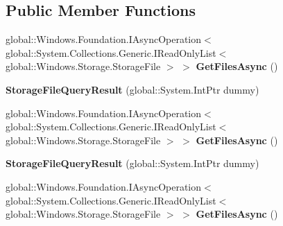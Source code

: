 \subsection*{Public Member Functions}
\begin{DoxyCompactItemize}
\item 
\mbox{\label{class_windows_1_1_storage_1_1_search_1_1_storage_file_query_result_a3c9c23aca5517c18087b5b0200d6de04}} 
global\+::\+Windows.\+Foundation.\+I\+Async\+Operation$<$ global\+::\+System.\+Collections.\+Generic.\+I\+Read\+Only\+List$<$ global\+::\+Windows.\+Storage.\+Storage\+File $>$ $>$ {\bfseries Get\+Files\+Async} ()
\item 
\mbox{\label{class_windows_1_1_storage_1_1_search_1_1_storage_file_query_result_accd8b919bc86f37f4a3609c2d88ab36e}} 
{\bfseries Storage\+File\+Query\+Result} (global\+::\+System.\+Int\+Ptr dummy)
\item 
\mbox{\label{class_windows_1_1_storage_1_1_search_1_1_storage_file_query_result_a3c9c23aca5517c18087b5b0200d6de04}} 
global\+::\+Windows.\+Foundation.\+I\+Async\+Operation$<$ global\+::\+System.\+Collections.\+Generic.\+I\+Read\+Only\+List$<$ global\+::\+Windows.\+Storage.\+Storage\+File $>$ $>$ {\bfseries Get\+Files\+Async} ()
\item 
\mbox{\label{class_windows_1_1_storage_1_1_search_1_1_storage_file_query_result_accd8b919bc86f37f4a3609c2d88ab36e}} 
{\bfseries Storage\+File\+Query\+Result} (global\+::\+System.\+Int\+Ptr dummy)
\item 
\mbox{\label{class_windows_1_1_storage_1_1_search_1_1_storage_file_query_result_a3c9c23aca5517c18087b5b0200d6de04}} 
global\+::\+Windows.\+Foundation.\+I\+Async\+Operation$<$ global\+::\+System.\+Collections.\+Generic.\+I\+Read\+Only\+List$<$ global\+::\+Windows.\+Storage.\+Storage\+File $>$ $>$ {\bfseries Get\+Files\+Async} ()
\item 
\mbox{\label{class_windows_1_1_storage_1_1_search_1_1_storage_file_query_result_accd8b919bc86f37f4a3609c2d88ab36e}} 

\end{DoxyCompactItemize}
